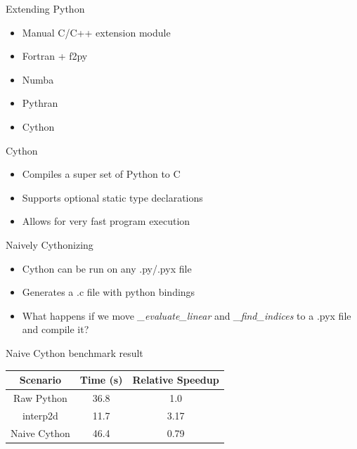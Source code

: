 \documentclass[12pt,xcolor=dvipsnames]{beamer}
\begin{document}
    \begin{frame}{Extending Python}
        \begin{itemize}
            \item Manual C/C++ extension module
            \item Fortran + f2py
            \item Numba
            \item Pythran
            \item Cython
        \end{itemize}
    \end{frame}

    \begin{frame}{Cython}
        \begin{itemize}
            \item Compiles a super set of Python to C
            \item Supports optional static type declarations
            \item Allows for very fast program execution
        \end{itemize}
    \end{frame}

    \begin{frame}{Naively Cythonizing}
        \begin{itemize}
            \item Cython can be run on any .py/.pyx file
            \item Generates a .c file with python bindings
            \item What happens if we move \textit{\_evaluate\_linear} and \textit{\_find\_indices} to a .pyx file and compile it?
        \end{itemize}
    \end{frame}

    \begin{frame}{Naive Cython benchmark result}
        \begin{center}
        \begin{tabular}{ | c | c | c | }
            \hline
            Scenario & Time (s) & Relative Speedup \\
            \hline
            Raw Python & 36.8 & 1.0 \\
            interp2d & 11.7 & 3.17 \\
            Naive Cython & 46.4 & 0.79 \\
            \hline
        \end{tabular}
        \end{center}
    \end{frame}
\end{document}
